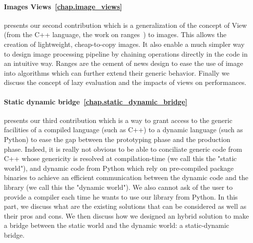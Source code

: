 \paragraph{Images Views~\ref{chap.image_views}} presents our second contribution which is a generalization of the
concept of View (from the C++ language, the work on ranges~\parencite{niebler.2018.ranges}) to images. This allows the
creation of lightweight, cheap-to-copy images. It also enable a much simpler way to design image processing pipeline by
chaining operations directly in the code in an intuitive way. Ranges are the cement of news design to ease the use of
image into algorithms which can further extend their generic behavior. Finally we discuss the concept of lazy evaluation
and the impacts of views on performances.

\paragraph{Static dynamic bridge~\ref{chap.static_dynamic_bridge}} presents our third contribution which is a way to
grant access to the generic facilities of a compiled language (such as C++) to a dynamic language (such as Python) to
ease the gap between the prototyping phase and the production phase. Indeed, it is really not obvious to be able to
conciliate generic code from C++ whose genericity is resolved at compilation-time (we call this the "static world"), and
dynamic code from Python which rely on pre-compiled package binaries to achieve an efficient communication between the
dynamic code and the library (we call this the "dynamic world"). We also cannot ask of the user to provide a compiler
each time he wants to use our library from Python. In this part, we discuss what are the existing solutions that can be
considered as well as their pros and cons. We then discuss how we designed an hybrid solution to make a bridge between
the static world and the dynamic world: a static-dynamic bridge.
